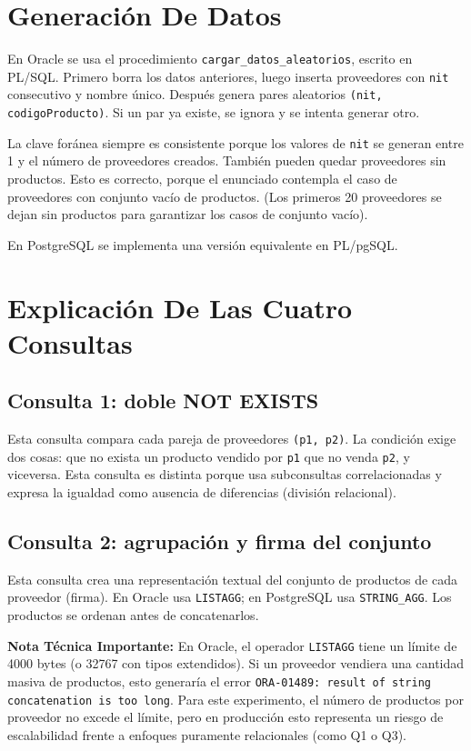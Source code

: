 \documentclass[12pt,a4paper]{article}
\begin{document}
\section{Generación De Datos}
En Oracle se usa el procedimiento \texttt{cargar\_datos\_aleatorios}, escrito en PL/SQL. Primero borra los datos anteriores, luego inserta proveedores con \texttt{nit} consecutivo y nombre único. Después genera pares aleatorios \texttt{(nit, codigoProducto)}. Si un par ya existe, se ignora y se intenta generar otro.

La clave foránea siempre es consistente porque los valores de \texttt{nit} se generan entre 1 y el número de proveedores creados. También pueden quedar proveedores sin productos. Esto es correcto, porque el enunciado contempla el caso de proveedores con conjunto vacío de productos. (Los primeros 20 proveedores se dejan sin productos para garantizar los casos de conjunto vacío).

En PostgreSQL se implementa una versión equivalente en PL/pgSQL.

\section{Explicación De Las Cuatro Consultas}
\subsection{Consulta 1: doble NOT EXISTS}
Esta consulta compara cada pareja de proveedores \texttt{(p1, p2)}. La condición exige dos cosas: que no exista un producto vendido por \texttt{p1} que no venda \texttt{p2}, y viceversa. Esta consulta es distinta porque usa subconsultas correlacionadas y expresa la igualdad como ausencia de diferencias (división relacional).

\subsection{Consulta 2: agrupación y firma del conjunto}
Esta consulta crea una representación textual del conjunto de productos de cada proveedor (firma). En Oracle usa \texttt{LISTAGG}; en PostgreSQL usa \texttt{STRING\_AGG}. Los productos se ordenan antes de concatenarlos.

\textbf{Nota Técnica Importante:} En Oracle, el operador \texttt{LISTAGG} tiene un límite de 4000 bytes (o 32767 con tipos extendidos). Si un proveedor vendiera una cantidad masiva de productos, esto generaría el error \texttt{ORA-01489: result of string concatenation is too long}. Para este experimento, el número de productos por proveedor no excede el límite, pero en producción esto representa un riesgo de escalabilidad frente a enfoques puramente relacionales (como Q1 o Q3).
\end{document}
